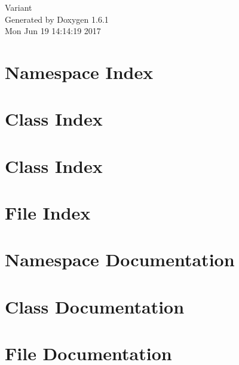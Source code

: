 \documentclass[a4paper]{book}
\begin{document}
\hypersetup{pageanchor=false}
\begin{titlepage}
\vspace*{7cm}
\begin{center}
{\Large Variant }\\
\vspace*{1cm}
{\large Generated by Doxygen 1.6.1}\\
\vspace*{0.5cm}
{\small Mon Jun 19 14:14:19 2017}\\
\end{center}
\end{titlepage}
\clearemptydoublepage
{}
\tableofcontents
\clearemptydoublepage
{}
\hypersetup{pageanchor=true}
\chapter{Namespace Index}

\chapter{Class Index}

\chapter{Class Index}

\chapter{File Index}

\chapter{Namespace Documentation}

\chapter{Class Documentation}
















\chapter{File Documentation}









\printindex
\end{document}
